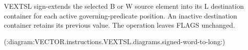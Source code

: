 VEXTSL sign-extends the selected B or W source element into its L destination
container for each active governing-predicate position.  An inactive destination
container retains its previous value.  The operation leaves FLAGS unchanged.

(:diagram:VECTOR.instructions.VEXTSL.diagrams.signed-word-to-long:)
